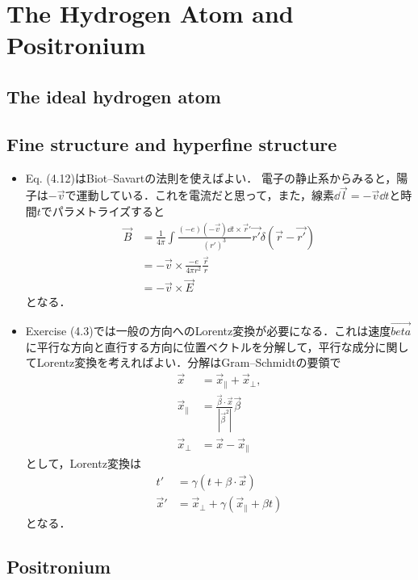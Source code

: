 \section{The Hydrogen Atom and Positronium}
\subsection{The ideal hydrogen atom}
\subsection{Fine structure and hyperfine structure}
\begin{itemize}
		\item Eq. (4.12)はBiot--Savartの法則を使えばよい．
				電子の静止系からみると，陽子は$-\vec{v} $で運動している．これを電流だと思って，また，線素$\dd{\vec{l}}=-\vec{v}\dd{t} $と時間$t $でパラメトライズすると
				\begin{align}
						\vec{B} &= \frac{1}{4\pi}\int\frac{(-e)(-\vec{v})\dd{t}\times\vec{r}'}{(r')^3}\vec{r'}\delta(\vec{r} - \vec{r'})\\
								&= -\vec{v}\times \frac{-e}{4\pi r^2}\frac{\vec{r}}{r}\\
								&= -\vec{v} \times \vec{E}
				\end{align}
				となる．
		\item Exercise (4.3)では一般の方向へのLorentz変換が必要になる．これは速度$\vec{beta} $に平行な方向と直行する方向に位置ベクトルを分解して，平行な成分に関してLorentz変換を考えればよい．分解はGram--Schmidtの要領で
				\begin{align}
						\vec{x} &= \vec{x}_{\parallel}+\vec{x}_{\perp},\\
						\vec{x}_{\parallel} &= \frac{\vec{\beta}\cdot\vec{x}}{|\vec{\beta}^2|}\vec{\beta}\\
						\vec{x}_{\perp} &= \vec{x} - \vec{x}_{\parallel}
				\end{align}
				として，Lorentz変換は
				\begin{align}
						t' &= \gamma(t + \beta \cdot \vec{x})\\
						\vec{x}' &= \vec{x}_{\perp} + \gamma(\vec{x}_{\parallel} + \beta t)
				\end{align}
				となる．
\end{itemize}
\subsection{Positronium}
